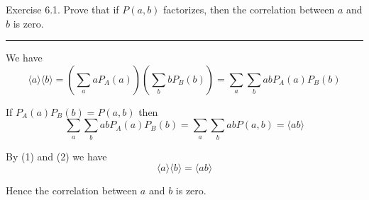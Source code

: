 \documentclass[12pt]{article}
\begin{document}
Exercise 6.1.
Prove that if $P(a,b)$ factorizes, then the correlation
between $a$ and $b$ is zero.

\bigskip
\hrule

\bigskip
We have
\begin{equation*}
\langle a\rangle\langle b\rangle
=\left(\sum_aaP_A(a)\right)\left(\sum_bbP_B(b)\right)
=\sum_a\sum_babP_A(a)P_B(b)
\tag{1}
\end{equation*}

If $P_A(a)P_B(b)=P(a,b)$ then
\begin{equation*}
\sum_a\sum_babP_A(a)P_B(b)=\sum_a\sum_babP(a,b)=\langle ab\rangle
\tag{2}
\end{equation*}

By (1) and (2) we have
\begin{equation*}
\langle a\rangle\langle b\rangle=\langle ab\rangle
\end{equation*}

Hence the correlation between $a$ and $b$ is zero.
\end{document}
